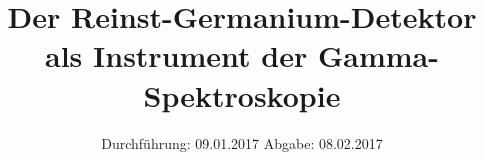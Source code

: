 

\subject{Versuch Nr. 18}
\title{Der Reinst-Germanium-Detektor als Instrument der Gamma-Spektroskopie}
\date{
  Durchführung: 09.01.2017
  \hspace{3em}
  Abgabe: 08.02.2017
}



\listoftodos

\maketitle
\thispagestyle{empty}
\tableofcontents
\newpage






\printbibliography


